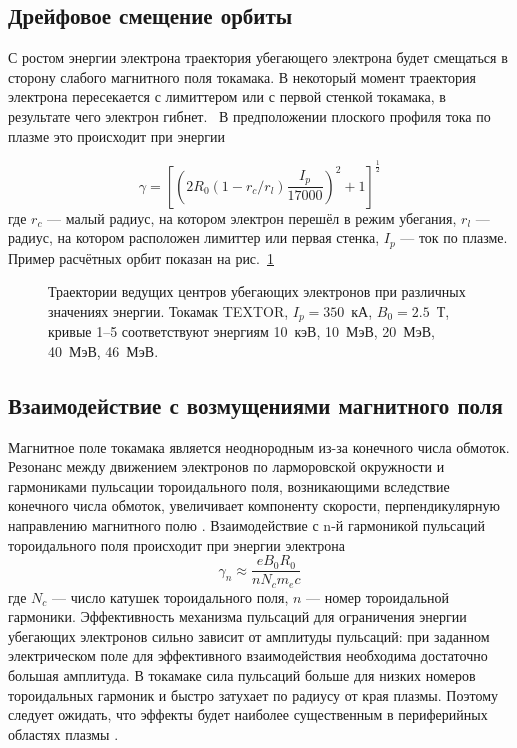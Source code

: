 
\subsection{Дрейфовое смещение орбиты}

С ростом энергии электрона траектория убегающего электрона будет смещаться в сторону слабого магнитного поля токамака. В некоторый момент траектория электрона пересекается с лимиттером или с первой стенкой токамака, в результате чего электрон гибнет.~\cite{MartinSolis1999,Carbajal2017} В предположении плоского профиля тока по плазме это происходит при энергии \cite{Knoepfel1979,MartinSolis1999}

\begin{equation*}
  \gamma = \left[ \left( 2 R_0 ( 1 - r_c / r_l ) \frac{I_p}{17000} \right)^2 + 1 \right]^{\frac{1}{2}}
\end{equation*}
где $r_c$ --- малый радиус, на котором электрон перешёл в режим убегания, $r_l$ --- радиус, на котором расположен лимиттер или первая стенка, $I_p$ --- ток по плазме. Пример расчётных орбит показан на рис.~\ref{fig:breizmanOrbits}

\begin{figure}[ht]
  \caption{ Траектории ведущих центров убегающих электронов при различных значениях энергии. Токамак TEXTOR, $I_p = 350$~кА, $B_0 = 2.5$~Т, кривые 1--5 соответствуют энергиям 10~кэВ, 10~МэВ, 20~МэВ, 40~МэВ, 46~МэВ\cite{Breizman2019,Abdullaev2016}.}
  \label{fig:breizmanOrbits}
\end{figure}


\subsection{Взаимодействие с возмущениями магнитного поля}

Магнитное поле токамака является неоднородным из-за конечного числа обмоток. Резонанс между движением электронов по ларморовской окружности и гармониками пульсации тороидального поля, возникающими вследствие конечного числа обмоток, увеличивает компоненту скорости, перпендикулярную направлению магнитного полю \cite{MartinSolis1998,MartinSolis1999,Laurent1990}. Взаимодействие с n-й гармоникой пульсаций тороидального поля происходит при энергии электрона 
\begin{equation*}
  \gamma_n \approx \frac{ e B_0 R_0 }{ n N_c m_e c }
\end{equation*}
где $N_c$ --- число катушек тороидального поля, $n$ --- номер тороидальной гармоники. Эффективность механизма пульсаций для ограничения энергии убегающих электронов сильно зависит от амплитуды пульсаций: при заданном электрическом поле для эффективного взаимодействия необходима достаточно большая амплитуда. В токамаке сила пульсаций больше для низких номеров тороидальных гармоник и быстро затухает по радиусу от края плазмы. Поэтому следует ожидать, что эффекты будет наиболее существенным в периферийных областях плазмы \cite{MartinSolis1998}.

